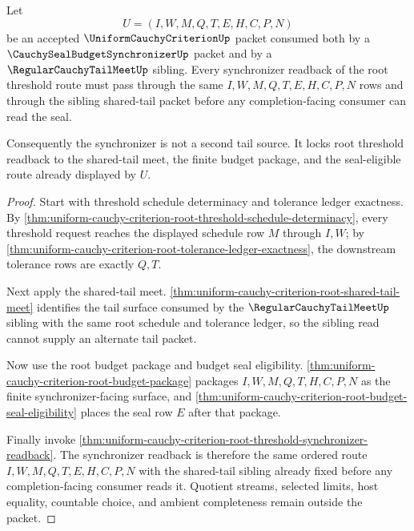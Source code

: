 \begin{theorem}
\label{thm:uniform-cauchy-criterion-root-synchronizer-tail-meet-lock}
Let
$$
U=(I,W,M,Q,T,E,H,C,P,N)
$$
be an accepted $\UniformCauchyCriterionUp$ packet consumed both by a $\CauchySealBudgetSynchronizerUp$ packet and by a $\RegularCauchyTailMeetUp$ sibling. Every synchronizer readback of the root threshold route must pass through the same $I,W,M,Q,T,E,H,C,P,N$ rows and through the sibling shared-tail packet before any completion-facing consumer can read the seal.

Consequently the synchronizer is not a second tail source. It locks root threshold readback to the shared-tail meet, the finite budget package, and the seal-eligible route already displayed by $U$.
\end{theorem}
\begin{proof}
Start with threshold schedule determinacy and tolerance ledger exactness. By \autoref{thm:uniform-cauchy-criterion-root-threshold-schedule-determinacy}, every threshold request reaches the displayed schedule row $M$ through $I,W$; by \autoref{thm:uniform-cauchy-criterion-root-tolerance-ledger-exactness}, the downstream tolerance rows are exactly $Q,T$.

Next apply the shared-tail meet. \autoref{thm:uniform-cauchy-criterion-root-shared-tail-meet} identifies the tail surface consumed by the $\RegularCauchyTailMeetUp$ sibling with the same root schedule and tolerance ledger, so the sibling read cannot supply an alternate tail packet.

Now use the root budget package and budget seal eligibility. \autoref{thm:uniform-cauchy-criterion-root-budget-package} packages $I,W,M,Q,T,H,C,P,N$ as the finite synchronizer-facing surface, and \autoref{thm:uniform-cauchy-criterion-root-budget-seal-eligibility} places the seal row $E$ after that package.

Finally invoke \autoref{thm:uniform-cauchy-criterion-root-threshold-synchronizer-readback}. The synchronizer readback is therefore the same ordered route $I,W,M,Q,T,E,H,C,P,N$ with the shared-tail sibling already fixed before any completion-facing consumer reads it. Quotient streams, selected limits, host equality, countable choice, and ambient completeness remain outside the packet.
\end{proof}

